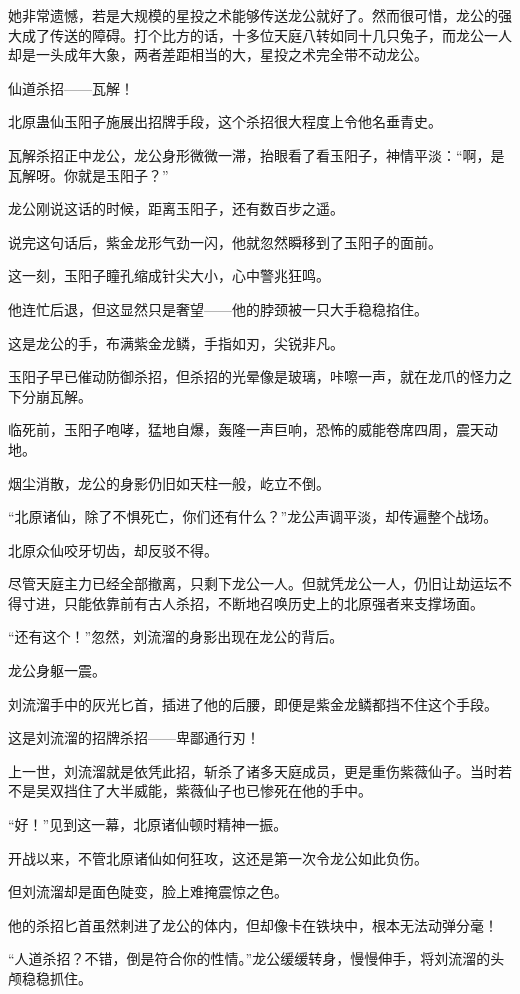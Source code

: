 \begin{this_body}
她非常遗憾，若是大规模的星投之术能够传送龙公就好了。然而很可惜，龙公的强大成了传送的障碍。打个比方的话，十多位天庭八转如同十几只兔子，而龙公一人却是一头成年大象，两者差距相当的大，星投之术完全带不动龙公。

仙道杀招——瓦解！

北原蛊仙玉阳子施展出招牌手段，这个杀招很大程度上令他名垂青史。

瓦解杀招正中龙公，龙公身形微微一滞，抬眼看了看玉阳子，神情平淡：“啊，是瓦解呀。你就是玉阳子？”

龙公刚说这话的时候，距离玉阳子，还有数百步之遥。

说完这句话后，紫金龙形气劲一闪，他就忽然瞬移到了玉阳子的面前。

这一刻，玉阳子瞳孔缩成针尖大小，心中警兆狂鸣。

他连忙后退，但这显然只是奢望——他的脖颈被一只大手稳稳掐住。

这是龙公的手，布满紫金龙鳞，手指如刃，尖锐非凡。

玉阳子早已催动防御杀招，但杀招的光晕像是玻璃，咔嚓一声，就在龙爪的怪力之下分崩瓦解。

临死前，玉阳子咆哮，猛地自爆，轰隆一声巨响，恐怖的威能卷席四周，震天动地。

烟尘消散，龙公的身影仍旧如天柱一般，屹立不倒。

“北原诸仙，除了不惧死亡，你们还有什么？”龙公声调平淡，却传遍整个战场。

北原众仙咬牙切齿，却反驳不得。

尽管天庭主力已经全部撤离，只剩下龙公一人。但就凭龙公一人，仍旧让劫运坛不得寸进，只能依靠前有古人杀招，不断地召唤历史上的北原强者来支撑场面。

“还有这个！”忽然，刘流溜的身影出现在龙公的背后。

龙公身躯一震。

刘流溜手中的灰光匕首，插进了他的后腰，即便是紫金龙鳞都挡不住这个手段。

这是刘流溜的招牌杀招——卑鄙通行刃！

上一世，刘流溜就是依凭此招，斩杀了诸多天庭成员，更是重伤紫薇仙子。当时若不是吴双挡住了大半威能，紫薇仙子也已惨死在他的手中。

“好！”见到这一幕，北原诸仙顿时精神一振。

开战以来，不管北原诸仙如何狂攻，这还是第一次令龙公如此负伤。

但刘流溜却是面色陡变，脸上难掩震惊之色。

他的杀招匕首虽然刺进了龙公的体内，但却像卡在铁块中，根本无法动弹分毫！

“人道杀招？不错，倒是符合你的性情。”龙公缓缓转身，慢慢伸手，将刘流溜的头颅稳稳抓住。


\end{this_body}

